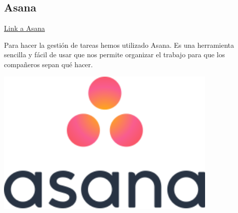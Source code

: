 \documentclass[12pt,a4paper]{article}
\begin{document}
\clearpage

\subsection{Asana}

\href{https://app.asana.com/0/1200160063450177/board}{Link a Asana}\\


\begin{minipage}{.75\textwidth}
Para hacer la gestión de tareas hemos utilizado Asana. Es una herramienta sencilla y fácil de usar que nos permite organizar el trabajo para que los compañeros sepan qué hacer.\\
\end{minipage} %
\begin{minipage}{.25\textwidth}
  \includegraphics[width=0.8\textwidth, right]{asana}
\end{minipage}
\end{document}
